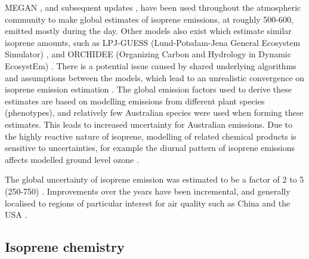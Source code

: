     MEGAN \parencite{Guenther1995}, and subsequent updates 
    \parencite{Guenther2000, Guenther2006, Guenther2012}, have been used 
    throughout the atmospheric community to make global estimates of isoprene 
    emissions, at roughly 500-600\tgpyr, emitted mostly during the day.
    Other models also exist which estimate similar isoprene amounts, such as 
    LPJ-GUESS (Lund-Potsdam-Jena General Ecosystem Simulator) 
    \parencite{Arneth2007}, and ORCHIDEE (Organizing Carbon and Hydrology in 
    Dynamic EcosystEm) \parencite{Messina2016}.
    There is a potential issue caused by shared underlying algorithms and 
    assumptions between the models, which lead to an unrealistic convergence on 
    isoprene emission estimation \parencite{Arneth2008}.
    The global emission factors used to derive these estimates are based on 
    modelling emissions from different plant species (phenotypes), and 
    relatively few Australian species were used when forming these estimates.
    This leads to increased uncertainty for Australian emissions.
    Due to the highly reactive nature of isoprene, modelling of related 
    chemical products is sensitive to uncertainties, for example the diurnal 
    pattern of isoprene emissions affects modelled ground level ozone 
    \parencite{Hewitt2011, Fan2004}.
    
    The global uncertainty of isoprene emission was estimated to be a factor of 2 to 5 (250-750\tgpyr) \parencite{Kanakidou2005}.
    Improvements over the years have been incremental, and generally localised to regions of particular interest for air quality such as China and the USA \parencite{Guenther2012, Jiang2018}.
    
  \subsection{Isoprene chemistry}
    \label{LR:VOCs:IsopCascade}
    
